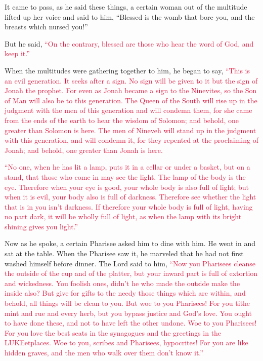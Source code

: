 \myverse{}It came to pass, as he said these things, a certain woman out
of the multitude lifted up her voice and said to him, “Blessed is the womb that bore you, and the breasts
which nursed you!”

\myverse{}But he said,
\textcolor{crimson}{“On the contrary, blessed are those who hear the word of God, and keep it.”}

\myverse{}When the multitudes were gathering together to him, he began
to say,
\textcolor{crimson}{“This is an evil generation. It seeks after a sign. No sign will be given to it but the sign of Jonah
	the prophet.
}
\myverse{}\textcolor{crimson}{For even as Jonah became a sign to the Ninevites, so the Son of Man will
	also be to this generation.
}
\myverse{}\textcolor{crimson}{The Queen of the South will rise up in the judgment with the men of this
	generation and will condemn them, for she came from the ends of the earth to hear the wisdom of Solomon;
	and behold, one greater than Solomon is here.
}
\myverse{}\textcolor{crimson}{The men of Nineveh will stand up in the judgment with this generation,
	and will condemn it, for they repented at the proclaiming of Jonah; and behold, one greater than Jonah
	is here.}

\myverse{}\textcolor{crimson}{“No one, when he has lit a lamp, puts it in a cellar or
	under a basket, but on a stand, that those who come in may see the light.
}
\myverse{}\textcolor{crimson}{The lamp of the body is the eye. Therefore when your eye is good, your
	whole body is also full of light; but when it is evil, your body also is full of darkness.
}
\myverse{}\textcolor{crimson}{Therefore see whether the light that is in you isn’t darkness.
}
\myverse{}\textcolor{crimson}{If therefore your whole body is full of light, having no part dark, it
	will be wholly full of light, as when the lamp with its bright shining gives you light.”}

\myverse{}Now as he spoke, a certain Pharisee asked him to dine with him.
He went in and sat at the table.
\myverse{}When the Pharisee saw it, he marveled that he had not first washed himself
before dinner.
\myverse{}The Lord said to him,
\textcolor{crimson}{“Now you Pharisees cleanse the outside of the cup and of the platter, but your inward part is full
	of extortion and wickedness.
}
\myverse{}\textcolor{crimson}{You foolish ones, didn’t he who made the outside make the inside also?
}
\myverse{}\textcolor{crimson}{But give for gifts to the needy those things which are within, and behold,
	all things will be clean to you.
}
\myverse{}\textcolor{crimson}{But woe to you Pharisees! For you tithe mint and rue and every herb,
	but you bypass justice and God’s love. You ought to have done these, and not to have left the other undone.
}
\myverse{}\textcolor{crimson}{Woe to you Pharisees! For you love the best seats in the synagogues and
	the greetings in the LUKEetplaces.
}
\myverse{}\textcolor{crimson}{Woe to you, scribes and Pharisees, hypocrites! For you are like hidden
	graves, and the men who walk over them don’t know it.”}

